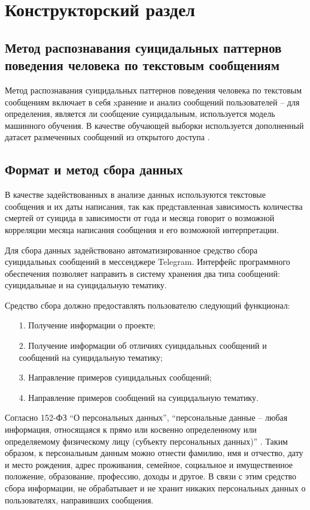 \section{Конструкторский раздел}

\subsection{Метод распознавания суицидальных паттернов поведения человека по текстовым сообщениям}

Метод распознавания суицидальных паттернов поведения человека по текстовым сообщениям включает в себя xранение и анализ сообщений пользователей -- для определения, является ли сообщение суицидальным, используется модель машинного обучения. В качестве обучающей выборки используется дополненный датасет размеченных сообщений из открытого доступа \cite{dataset}.

\subsection{Формат и метод сбора данных }

В качестве задействованных в анализе данных используются текстовые сообщения и их даты написания, так как представленная зависимость количества смертей от суицида в зависимости от года и месяца говорит о возможной корреляции месяца написания сообщения и его возможной интерпретации.

Для сбора данных задействовано автоматизированное средство сбора суицидальных сообщений в мессенджере Telegram. Интерфейс программного обеспечения позволяет направить в систему хранения два типа сообщений: суицидальные и на суицидальную тематику.

Средство сбора должно предоставлять пользователю следующий функционал:

\begin{enumerate}
\item[1.] Получение информации о проекте;
\item[2.] Получение информации об отличиях суицидальных сообщений и сообщений на суицидальную тематику;
\item[3.] Направление примеров суицидальных сообщений;
\item[4.] Направление примеров сообщений на суицидальную тематику.
\end{enumerate}

Согласно 152-ФЗ ``О персональных данных'', ``персональные данные -- любая информация, относящаяся к прямо или косвенно определенному или определяемому физическому лицу (субъекту персональных данных)'' \cite{fzpers}. Таким образом, к персональным данным можно отнести фамилию, имя и отчество, дату и место рождения, адрес проживания, семейное, социальное и имущественное положение, образование, профессию, доходы и другое. В связи с этим средство сбора информации, не обрабатывает и не хранит никаких персональных данных о пользователях, направивших сообщения.

